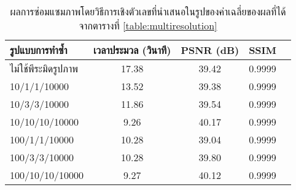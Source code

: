 \begin{table}[H]
    \centering
    \begin{tabular}[ht]{|l|c|c|c|c|}
        \hline
        รูปแบบการทำซ้ำ  & เวลาประมวล  (วินาที) & PSNR (dB) & SSIM \\
        \hline
        ไม่ใช้พีระมิดรูปภาพ & 17.38 & 39.42 & 0.9999 \\
        10/1/1/10000 & 13.52 & 39.38 & 0.9999 \\
        10/3/3/10000 & 11.86 & 39.54 & 0.9999 \\
        10/10/10/10000 & 9.26 & 40.17 & 0.9999\\
        100/1/1/10000 & 10.28 & 39.04 & 0.9999\\
        100/3/3/10000 & 10.28 & 39.80 & 0.9999\\
        100/10/10/10000 & 9.27 & 40.12 & 0.9999 \\
        \hline
    \end{tabular}
    \caption{ผลการซ่อมแซมภาพโดยวิธีการเชิงตัวเลขที่นำเสนอในรูปของค่าเฉลี่ยของผลที่ได้จากตารางที่ \ref{table:multiresolution}}
    \label{table:multiresolution-summary}
\end{table}	